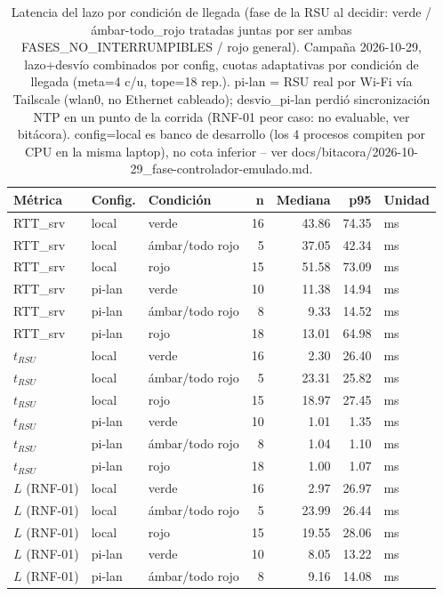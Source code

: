 \begin{table}[H]
\centering
\caption{Latencia del lazo por condición de llegada (fase de la RSU al decidir: verde / ámbar-todo\_rojo tratadas juntas por ser ambas FASES\_NO\_INTERRUMPIBLES / rojo general). Campaña 2026-10-29, lazo+desvío combinados por config, cuotas adaptativas por condición de llegada (meta=4 c/u, tope=18 rep.). pi-lan = RSU real por Wi-Fi vía Tailscale (wlan0, no Ethernet cableado); desvio_pi-lan perdió sincronización NTP en un punto de la corrida (RNF-01 peor caso: no evaluable, ver bitácora). config=local es banco de desarrollo (los 4 procesos compiten por CPU en la misma laptop), no cota inferior -- ver docs/bitacora/2026-10-29_fase-controlador-emulado.md.}
\label{tab:latencia_por_condicion}
\small
\begin{tabular}{lllrrrl}
\toprule
\textbf{Métrica} & \textbf{Config.} & \textbf{Condición} & \textbf{n} & \textbf{Mediana} & \textbf{p95} & \textbf{Unidad} \\
\midrule
RTT\_srv & local & verde & 16 & 43.86 & 74.35 & ms \\
RTT\_srv & local & ámbar/todo rojo & 5 & 37.05 & 42.34 & ms \\
RTT\_srv & local & rojo & 15 & 51.58 & 73.09 & ms \\
RTT\_srv & pi-lan & verde & 10 & 11.38 & 14.94 & ms \\
RTT\_srv & pi-lan & ámbar/todo rojo & 8 & 9.33 & 14.52 & ms \\
RTT\_srv & pi-lan & rojo & 18 & 13.01 & 64.98 & ms \\
$t_{RSU}$ & local & verde & 16 & 2.30 & 26.40 & ms \\
$t_{RSU}$ & local & ámbar/todo rojo & 5 & 23.31 & 25.82 & ms \\
$t_{RSU}$ & local & rojo & 15 & 18.97 & 27.45 & ms \\
$t_{RSU}$ & pi-lan & verde & 10 & 1.01 & 1.35 & ms \\
$t_{RSU}$ & pi-lan & ámbar/todo rojo & 8 & 1.04 & 1.10 & ms \\
$t_{RSU}$ & pi-lan & rojo & 18 & 1.00 & 1.07 & ms \\
$L$ (RNF-01) & local & verde & 16 & 2.97 & 26.97 & ms \\
$L$ (RNF-01) & local & ámbar/todo rojo & 5 & 23.99 & 26.44 & ms \\
$L$ (RNF-01) & local & rojo & 15 & 19.55 & 28.06 & ms \\
$L$ (RNF-01) & pi-lan & verde & 10 & 8.05 & 13.22 & ms \\
$L$ (RNF-01) & pi-lan & ámbar/todo rojo & 8 & 9.16 & 14.08 & ms \\

\end{tabular}
\end{table}
